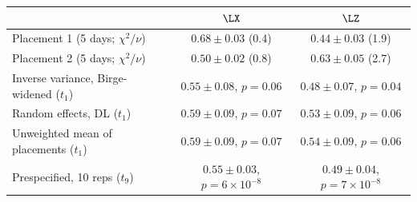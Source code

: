 \begin{tabular}{lcc}
 & $\LX$ & $\LZ$ \\
\hline
Placement 1 (5 days; $\chi^2/\nu$) & $0.68\pm0.03$ (0.4) & $0.44\pm0.03$ (1.9) \\
Placement 2 (5 days; $\chi^2/\nu$) & $0.50\pm0.02$ (0.8) & $0.63\pm0.05$ (2.7) \\
Inverse variance, Birge-widened ($t_1$) & $0.55\pm0.08$, $p=0.06$ & $0.48\pm0.07$, $p=0.04$ \\
Random effects, DL ($t_1$) & $0.59\pm0.09$, $p=0.07$ & $0.53\pm0.09$, $p=0.06$ \\
Unweighted mean of placements ($t_1$) & $0.59\pm0.09$, $p=0.07$ & $0.54\pm0.09$, $p=0.06$ \\
Prespecified, 10 reps ($t_9$) & $0.55\pm0.03$, $p=6\times10^{-8}$ & $0.49\pm0.04$, $p=7\times10^{-8}$ \\
\end{tabular}
